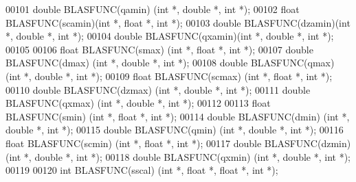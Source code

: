 \begin{DoxyCode}
00101 \textcolor{keywordtype}{double} BLASFUNC(qamin) (\textcolor{keywordtype}{int} *, \textcolor{keywordtype}{double} *, \textcolor{keywordtype}{int} *);
00102 \textcolor{keywordtype}{float}  BLASFUNC(scamin)(\textcolor{keywordtype}{int} *, \textcolor{keywordtype}{float}  *, \textcolor{keywordtype}{int} *);
00103 \textcolor{keywordtype}{double} BLASFUNC(dzamin)(\textcolor{keywordtype}{int} *, \textcolor{keywordtype}{double} *, \textcolor{keywordtype}{int} *);
00104 \textcolor{keywordtype}{double} BLASFUNC(qxamin)(\textcolor{keywordtype}{int} *, \textcolor{keywordtype}{double} *, \textcolor{keywordtype}{int} *);
00105 
00106 \textcolor{keywordtype}{float}  BLASFUNC(smax)  (\textcolor{keywordtype}{int} *, \textcolor{keywordtype}{float}  *, \textcolor{keywordtype}{int} *);
00107 \textcolor{keywordtype}{double} BLASFUNC(dmax)  (\textcolor{keywordtype}{int} *, \textcolor{keywordtype}{double} *, \textcolor{keywordtype}{int} *);
00108 \textcolor{keywordtype}{double} BLASFUNC(qmax)  (\textcolor{keywordtype}{int} *, \textcolor{keywordtype}{double} *, \textcolor{keywordtype}{int} *);
00109 \textcolor{keywordtype}{float}  BLASFUNC(scmax) (\textcolor{keywordtype}{int} *, \textcolor{keywordtype}{float}  *, \textcolor{keywordtype}{int} *);
00110 \textcolor{keywordtype}{double} BLASFUNC(dzmax) (\textcolor{keywordtype}{int} *, \textcolor{keywordtype}{double} *, \textcolor{keywordtype}{int} *);
00111 \textcolor{keywordtype}{double} BLASFUNC(qxmax) (\textcolor{keywordtype}{int} *, \textcolor{keywordtype}{double} *, \textcolor{keywordtype}{int} *);
00112 
00113 \textcolor{keywordtype}{float}  BLASFUNC(smin)  (\textcolor{keywordtype}{int} *, \textcolor{keywordtype}{float}  *, \textcolor{keywordtype}{int} *);
00114 \textcolor{keywordtype}{double} BLASFUNC(dmin)  (\textcolor{keywordtype}{int} *, \textcolor{keywordtype}{double} *, \textcolor{keywordtype}{int} *);
00115 \textcolor{keywordtype}{double} BLASFUNC(qmin)  (\textcolor{keywordtype}{int} *, \textcolor{keywordtype}{double} *, \textcolor{keywordtype}{int} *);
00116 \textcolor{keywordtype}{float}  BLASFUNC(scmin) (\textcolor{keywordtype}{int} *, \textcolor{keywordtype}{float}  *, \textcolor{keywordtype}{int} *);
00117 \textcolor{keywordtype}{double} BLASFUNC(dzmin) (\textcolor{keywordtype}{int} *, \textcolor{keywordtype}{double} *, \textcolor{keywordtype}{int} *);
00118 \textcolor{keywordtype}{double} BLASFUNC(qxmin) (\textcolor{keywordtype}{int} *, \textcolor{keywordtype}{double} *, \textcolor{keywordtype}{int} *);
00119 
00120 \textcolor{keywordtype}{int}    BLASFUNC(sscal) (\textcolor{keywordtype}{int} *,  \textcolor{keywordtype}{float}  *, \textcolor{keywordtype}{float}  *, \textcolor{keywordtype}{int} *);

\end{DoxyCode}
